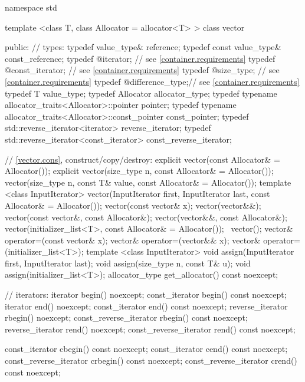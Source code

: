 \begin{codeblock}
namespace std {
  template <class T, class Allocator = allocator<T> >
  class vector {
  public:
    // types:
    typedef value_type&                           reference;
    typedef const value_type&                     const_reference;
    typedef @\impdef@                iterator;       // see \ref{container.requirements}
    typedef @\impdef@                const_iterator; // see \ref{container.requirements}
    typedef @\impdef@                size_type;      // see \ref{container.requirements}
    typedef @\impdef@                difference_type;// see \ref{container.requirements}
    typedef T                                     value_type;
    typedef Allocator                             allocator_type;
    typedef typename allocator_traits<Allocator>::pointer           pointer;
    typedef typename allocator_traits<Allocator>::const_pointer     const_pointer;
    typedef std::reverse_iterator<iterator>       reverse_iterator;
    typedef std::reverse_iterator<const_iterator> const_reverse_iterator;

    // \ref{vector.cons}, construct/copy/destroy:
    explicit vector(const Allocator& = Allocator());
    explicit vector(size_type n, const Allocator& = Allocator());
    vector(size_type n, const T& value, const Allocator& = Allocator());
    template <class InputIterator>
      vector(InputIterator first, InputIterator last,
             const Allocator& = Allocator());
    vector(const vector& x);
    vector(vector&&);
    vector(const vector&, const Allocator&);
    vector(vector&&, const Allocator&);
    vector(initializer_list<T>, const Allocator& = Allocator());
   ~vector();
    vector& operator=(const vector& x);
    vector& operator=(vector&& x);
    vector& operator=(initializer_list<T>);
    template <class InputIterator>
      void assign(InputIterator first, InputIterator last);
    void assign(size_type n, const T& u);
    void assign(initializer_list<T>);
    allocator_type get_allocator() const noexcept;

    // iterators:
    iterator               begin() noexcept;
    const_iterator         begin() const noexcept;
    iterator               end() noexcept;
    const_iterator         end() const noexcept;
    reverse_iterator       rbegin() noexcept;
    const_reverse_iterator rbegin() const noexcept;
    reverse_iterator       rend() noexcept;
    const_reverse_iterator rend() const noexcept;

    const_iterator         cbegin() const noexcept;
    const_iterator         cend() const noexcept;
    const_reverse_iterator crbegin() const noexcept;
    const_reverse_iterator crend() const noexcept;

}}
\end{codeblock}
